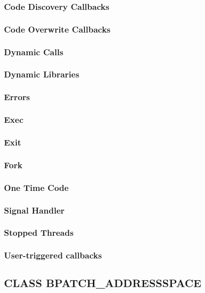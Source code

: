 \subsubsection{Code Discovery Callbacks}

\subsubsection{Code Overwrite Callbacks}

\subsubsection{Dynamic Calls}

\subsubsection{Dynamic Libraries}

\subsubsection{Errors}

\subsubsection{Exec}
\subsubsection{Exit}
\subsubsection{Fork}
\subsubsection{One Time Code}
\subsubsection{Signal Handler}
\subsubsection{Stopped Threads}
\subsubsection{User-triggered callbacks}
\subsection{CLASS BPATCH\_ADDRESSSPACE}
